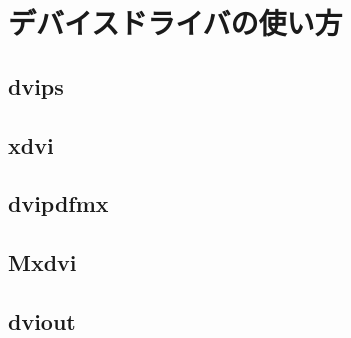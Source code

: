 \chapter{デバイスドライバの使い方}

\section{dvips}

\section{xdvi}

\section{dvipdfmx}

\section{Mxdvi}

\section{dviout}

